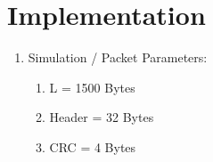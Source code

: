 \section{Implementation} 
\label{sec:impl}

\begin{enumerate}

	\item Simulation / Packet Parameters:
	\begin{enumerate}
		\item L = 1500 Bytes
		\item Header = 32 Bytes
		\item CRC = 4 Bytes
	\end{enumerate}


\end{enumerate}



